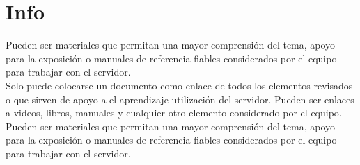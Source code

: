 \section{Info}
  Pueden ser materiales que permitan una mayor comprensión del tema, apoyo para la exposición o 
  manuales de referencia fiables considerados por el equipo para trabajar con el servidor.\\
  
  Solo puede colocarse un documento como enlace de todos los elementos revisados o que sirven de 
  apoyo a el aprendizaje utilización del servidor. Pueden ser enlaces a videos, libros, manuales y 
  cualquier otro elemento considerado por el equipo.\\
  
  Pueden ser materiales que permitan una mayor comprensión del tema, apoyo para la exposición o 
  manuales de referencia fiables considerados por el equipo para trabajar con el servidor.\\
   

  
